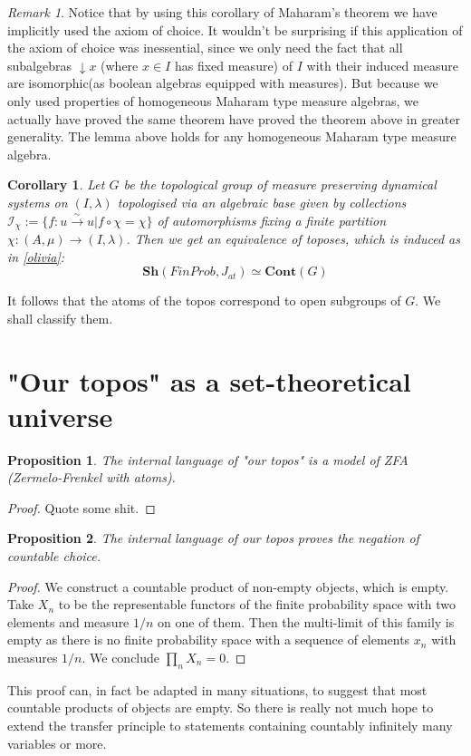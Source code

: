 \documentclass[a4paper]{amsproc}
\theoremstyle{plain}
\newtheorem{proposition}{Proposition}[section]
\newtheorem{corollary}{Corollary}[section]
\theoremstyle{definition}
\theoremstyle{remark}
\newtheorem{remark}{Remark}[section]
\numberwithin{equation}{section}
\begin{document}
\begin{remark}
Notice that by using this corollary of Maharam's theorem we have implicitly used the axiom of choice. It wouldn't be surprising if this application of the axiom of choice was inessential, since we only need the fact that all subalgebras $\downarrow x$ (where $x \in I$ has fixed measure) of $I$ with their induced measure are isomorphic(as boolean algebras equipped with measures). But because we only used properties of homogeneous Maharam type measure algebras,  we actually have proved the same theorem have proved the theorem above in greater generality. The lemma above holds for any homogeneous Maharam type measure algebra.
\end{remark}

\begin{corollary} Let $G$ be the topological group of measure preserving dynamical systems on $(I,\lambda)$ topologised via an algebraic base given by collections $\mathcal{I}_{\chi}:=\{f:u\overset{\sim}{\rightarrow} u| f\circ \chi=\chi\} $ of automorphisms fixing a finite partition $\chi: (A,\mu)\rightarrow (I,\lambda)$. Then we get an equivalence of toposes, which is induced as in \ref{olivia}:
\[\textbf{Sh}(FinProb, J_{at})\simeq \textbf{Cont}(G)\]
\end{corollary}
It follows that the atoms of the topos correspond to open subgroups of $G$. We shall classify them. %
\section{"Our topos" as a set-theoretical universe}
\begin{proposition} The internal language of "our topos" is a model of ZFA (Zermelo-Frenkel with atoms).
\end{proposition}
\begin{proof} Quote some shit.
\end{proof}
\begin{proposition} The internal language of our topos proves the negation of countable choice.
\end{proposition}
\begin{proof} We construct a countable product of non-empty objects, which is empty. Take $X_n$ to be the representable functors of the finite probability space with two elements and measure $1/n$ on one of them. Then the multi-limit of this family is empty as there is no finite probability space with a sequence of elements $x_n$ with measures $1/n$. We conclude $\prod_n X_n=0$.
\end{proof}
This proof can, in fact be adapted in many situations, to suggest that most countable products of objects are empty. So there is really not much hope to extend the transfer principle to statements containing countably infinitely many variables or more.
\end{document}
